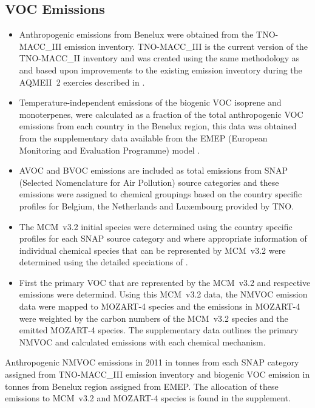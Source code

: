 \subsection{VOC Emissions} \label{ss:VOC_emissions}
\begin{itemize}
    \item Anthropogenic emissions from Benelux were obtained from the TNO-MACC\_III emission inventory. TNO-MACC\_III is the current version of the TNO-MACC\_II inventory and was created using the same methodology as \citet{Kuenen:2014} and based upon improvements to the existing emission inventory during the AQMEII~2 exercies described in \citet{Pouliot:2015}. 
    \item Temperature-independent emissions of the biogenic VOC isoprene and monoterpenes, were calculated as a fraction of the total anthropogenic VOC emissions from each country in the Benelux region, this data was obtained from the supplementary data available from the EMEP (European Monitoring and Evaluation Programme) model \citep{Simpson:2012}.
    \item AVOC and BVOC emissions are included as total emissions from SNAP (Selected Nomenclature for Air Pollution) source categories and these emissions were assigned to chemical groupings based on the country specific profiles for Belgium, the Netherlands and Luxembourg provided by TNO. 
    \item The MCM~v3.2 initial species were determined using the country specific profiles for each SNAP source category and where appropriate information of individual chemical species that can be represented by MCM~v3.2 were determined using the detailed speciations of \citet{Passant:2002}. %
    \item First the primary VOC that are represented by the MCM~v3.2 and respective emissions were determind. Using this MCM~v3.2 data, the NMVOC emission data were mapped to MOZART-4 species and the emissions in MOZART-4 were weighted by the carbon numbers of the MCM~v3.2 species and the emitted MOZART-4 species. The supplementary data outlines the primary NMVOC and calculated emissions with each chemical mechanism.
\end{itemize}
{%
    \renewcommand{\arraystretch}{1.1}%
    \begin{table}%
        \centering%
        \caption{Anthropogenic NMVOC emissions in 2011 in tonnes from each SNAP category assigned from TNO-MACC\_III emission inventory and biogenic VOC emission in tonnes from Benelux region assigned from EMEP. The allocation of these emissions to MCM~v3.2 and MOZART-4 species is found in the supplement.}%
        
    \end{table}%
}
{
    \begin{landscape}%
        \centering%
    \end{landscape}%
}


